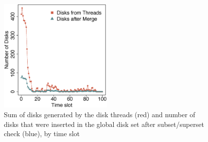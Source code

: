 {\begin{figure}[h!]
    \centering
    \includegraphics[width=0.5\textwidth]{images/Brinkhoff_disks_threads.eps}
    \caption{Sum of disks generated by the disk threads (red) and number of disks that were inserted in the global disk
        set after subset/superset check (blue), by time slot}
    \label{fig:brinkhoff_disks_threads}
\end{figure}

}
